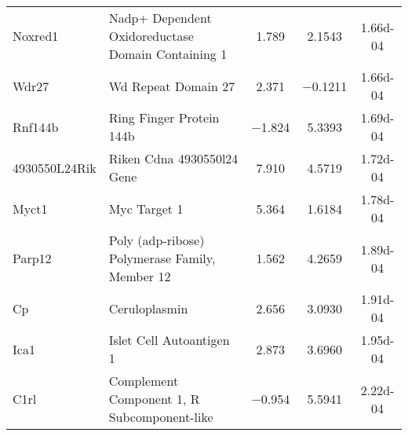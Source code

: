 {\begin{longtable}[l]{p{2.5cm}p{6.6cm}ccc}
Noxred1	& Nadp+ Dependent Oxidoreductase Domain Containing 1	& \num{ 1.789}	& \num{ 2.1543}	& \num{1.66d-04}\\ 
Wdr27	& Wd Repeat Domain 27	& \num{ 2.371}	& \num{-0.1211}	& \num{1.66d-04}\\ 
Rnf144b	& Ring Finger Protein 144b	& \num{-1.824}	& \num{ 5.3393}	& \num{1.69d-04}\\ 
4930550L24Rik	& Riken Cdna 4930550l24 Gene	& \num{ 7.910}	& \num{ 4.5719}	& \num{1.72d-04}\\ 
Myct1	& Myc Target 1	& \num{ 5.364}	& \num{ 1.6184}	& \num{1.78d-04}\\ 
Parp12	& Poly (adp-ribose) Polymerase Family, Member 12	& \num{ 1.562}	& \num{ 4.2659}	& \num{1.89d-04}\\ 
Cp	& Ceruloplasmin	& \num{ 2.656}	& \num{ 3.0930}	& \num{1.91d-04}\\ 
Ica1	& Islet Cell Autoantigen 1	& \num{ 2.873}	& \num{ 3.6960}	& \num{1.95d-04}\\ 
C1rl	& Complement Component 1, R Subcomponent-like	& \num{-0.954}	& \num{ 5.5941}	& \num{2.22d-04}\\ 
\end{longtable}
}

